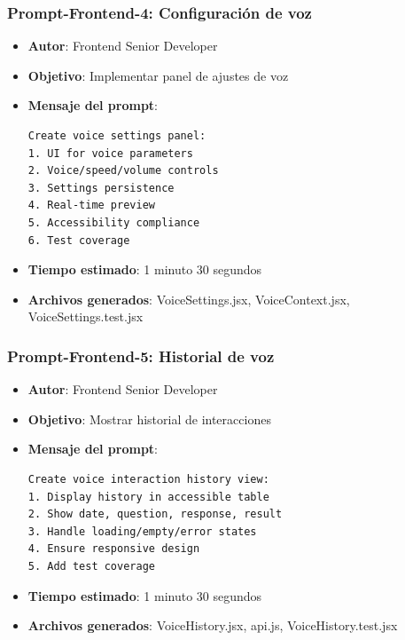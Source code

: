 \documentclass[12pt]{article}
\begin{document}
\subsubsection{Prompt-Frontend-4: Configuración de voz}
\begin{itemize}
    \item \textbf{Autor}: Frontend Senior Developer
    \item \textbf{Objetivo}: Implementar panel de ajustes de voz
    \item \textbf{Mensaje del prompt}:
    \begin{verbatim}
Create voice settings panel:
1. UI for voice parameters
2. Voice/speed/volume controls
3. Settings persistence
4. Real-time preview
5. Accessibility compliance
6. Test coverage
    \end{verbatim}
    \item \textbf{Tiempo estimado}: 1 minuto 30 segundos
    \item \textbf{Archivos generados}: VoiceSettings.jsx, VoiceContext.jsx, VoiceSettings.test.jsx
\end{itemize}

\subsubsection{Prompt-Frontend-5: Historial de voz}
\begin{itemize}
    \item \textbf{Autor}: Frontend Senior Developer
    \item \textbf{Objetivo}: Mostrar historial de interacciones
    \item \textbf{Mensaje del prompt}:
    \begin{verbatim}
Create voice interaction history view:
1. Display history in accessible table
2. Show date, question, response, result
3. Handle loading/empty/error states
4. Ensure responsive design
5. Add test coverage
    \end{verbatim}
    \item \textbf{Tiempo estimado}: 1 minuto 30 segundos
    \item \textbf{Archivos generados}: VoiceHistory.jsx, api.js, VoiceHistory.test.jsx
\end{itemize}
\end{document}
